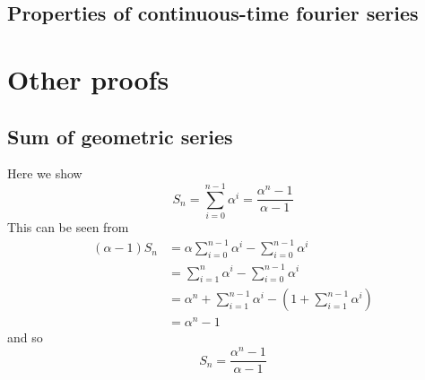 \documentclass{report}
\begin{document}
\section{Properties of continuous-time fourier series}













\appendix
\chapter{Other proofs}
\section{Sum of geometric series}
Here we show
\begin{equation*}
S_n=\sum^{n-1}_{i=0}\alpha^i=\frac{\alpha^n-1}{\alpha-1}
\end{equation*}
This can be seen from
\begin{align*}
(\alpha-1)S_n&=\alpha\sum^{n-1}_{i=0}\alpha^i-\sum^{n-1}_{i=0}\alpha^i\\
&=\sum^{n}_{i=1}\alpha^i-\sum^{n-1}_{i=0}\alpha^i\\
&=\alpha^n+\sum^{n-1}_{i=1}\alpha^i-(1+\sum^{n-1}_{i=1}\alpha^i)\\
&=\alpha^n-1
\end{align*}
and so
\begin{equation*}
S_n=\frac{\alpha^n-1}{\alpha-1}
\end{equation*}
\end{document}
